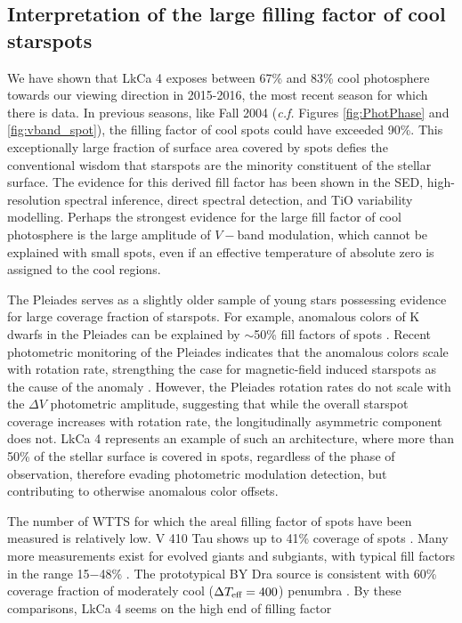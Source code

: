 \documentclass[twocolumn]{emulateapj}%
\begin{document}
\subsection{Interpretation of the large filling factor of cool starspots}
We have shown that LkCa 4 exposes between 67\% and 83\% cool photosphere towards our viewing direction in 2015-2016, the most recent season for which there is data.  In previous seasons, like Fall 2004 (\emph{c.f.} Figures \ref{fig:PhotPhase} and \ref{fig:vband_spot}), the filling factor of cool spots could have exceeded 90\%.  This exceptionally large fraction of surface area covered by spots defies the conventional wisdom that starspots are the minority constituent of the stellar surface.  The evidence for this derived fill factor has been shown in the SED, high-resolution spectral inference, direct spectral detection, and TiO variability modelling.  Perhaps the strongest evidence for the large fill factor of cool photosphere is the large amplitude of $V-$band modulation, which cannot be explained with small spots, even if an effective temperature of absolute zero is assigned to the cool regions.

The Pleiades serves as a slightly older sample of young stars possessing evidence for large coverage fraction of starspots.  For example, anomalous colors of K dwarfs in the Pleiades can be explained by $\sim$50\% fill factors of spots \citep{stauffer03}.  Recent photometric monitoring of the Pleiades indicates that the anomalous colors scale with rotation rate, strengthing the case for magnetic-field induced starspots as the cause of the anomaly \citep{covey16}.  However, the \citet{covey16} Pleiades rotation rates do not scale with the $\Delta V$ photometric amplitude, suggesting that while the overall starspot coverage increases with rotation rate, the longitudinally asymmetric component does not.  LkCa 4 represents an example of such an architecture, where more than 50\% of the stellar surface is covered in spots, regardless of the phase of observation, therefore evading photometric modulation detection, but contributing to otherwise anomalous color offsets.

The number of WTTS for which the areal filling factor of spots have been measured is relatively low.  V 410 Tau shows up to 41\% coverage of spots \citep{petrov94}.  Many more measurements exist for evolved giants and subgiants, with typical fill factors in the range 15$-$48\% \citep{berdyugina05}.  The prototypical BY Dra source is consistent with 60\% coverage fraction of moderately cool ($\Delta T_\textrm{eff} =400$) penumbra \citep{chugainov76}.  By these comparisons, LkCa 4 seems on the high end of filling factor
\end{document}
